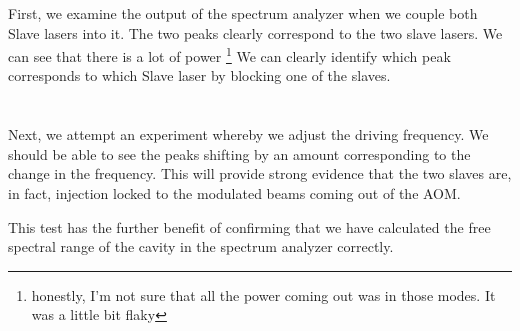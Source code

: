 First, we examine the output of the spectrum analyzer when we couple both Slave lasers into it. 
The two peaks clearly correspond to the two slave lasers. We can see that there is a lot of power \footnote{honestly, I'm not sure that all the power coming out was in those modes. It was a little bit flaky}
We can clearly identify which peak corresponds to which Slave laser by blocking one of the slaves. 

\section{}

Next, we attempt an experiment whereby we adjust the driving frequency. We should be able to see the peaks shifting by an amount corresponding to the change in the frequency. This will provide strong evidence that the two slaves are, in fact, injection locked to the modulated beams coming out of the AOM. 

This test has the further benefit of confirming that we have calculated the free spectral range of the cavity in the spectrum analyzer correctly. 


